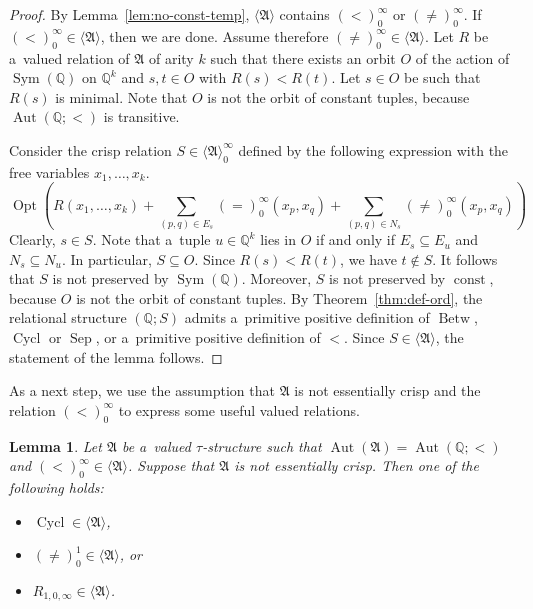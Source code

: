 \documentclass[preprint,12pt]{elsarticle}
\newcommand{\Q}{\mathbb Q}
\newcommand{\bA}{{\mathfrak A}}
\newcommand{\checked}[1]{#1}
\DeclareMathOperator{\Cyc}{Cycl}
\DeclareMathOperator{\Aut}{Aut}
\DeclareMathOperator{\Opt}{Opt}
\DeclareMathOperator{\Sym}{Sym}
\DeclareMathOperator{\const}{const}
\DeclareMathOperator{\Betw}{Betw}
\DeclareMathOperator{\Sep}{Sep}
\newtheorem{lemma}[theorem]{Lemma}
\begin{document}
\begin{proof}
By Lemma~\ref{lem:no-const-temp}, $\langle \bA \rangle$ contains $(<)_0^\infty$ or $(\neq)_0^\infty$. If $(<)_0^\infty \in \langle \bA \rangle$, then we are done. Assume therefore $(\neq)_0^\infty \in \langle \bA \rangle$. Let $R$ be a~valued relation of $\bA$ of arity $k$ such that there exists an orbit $O$ of the action of $\Sym(\Q)$ on $\Q^k$ and $s,t \in O$ with $R(s)<R(t)$. Let $s \in O$ be such that $R(s)$ is minimal. Note that $O$ is not the orbit of constant tuples, because $\Aut(\Q;<)$ is transitive.

Consider the crisp relation $S \in \langle \bA \rangle_0^\infty$ defined by the following expression with the free variables $x_1,\dots,x_k$. 
\[
\Opt \left( R(x_1, \dots, x_k) + \sum_{(p,q) \in E_s} (=)_0^\infty(x_p,x_q) + \sum_{(p,q) \in N_s} (\neq)_0^\infty(x_p,x_q) \right)\]
Clearly, $s \in S$.
Note that a~tuple $u \in \Q^k$ lies in $O$ if and only if
$E_s \subseteq E_u$ and $N_s \subseteq N_u$.
In particular, $S \subseteq O$.  Since $R(s) < R(t)$, we have $t \notin S$. It follows that $S$ is not preserved by $\Sym(\Q)$. Moreover, $S$ is not preserved by $\const$,  because $O$ is not the orbit of constant tuples. By Theorem~\ref{thm:def-ord}, the relational structure $(\Q; S)$
admits a~primitive positive definition of $\Betw$, $\Cyc$ or $\Sep$, 
or a~primitive positive  definition of $<$. Since $S \in \langle \bA \rangle$, the statement of the lemma follows.
\end{proof}


\checked{As a next step, we use the assumption that $\bA$ is not essentially crisp and the relation $(<)_0^\infty$ to express some useful valued relations.}

\begin{lemma}\label{lem:soft-neq}
Let $\bA$ be a~valued $\tau$-structure such that $\Aut(\bA) = \Aut(\Q; <)$ and $(<)_0^\infty \in \langle\bA\rangle$. Suppose that $\bA$ is not essentially crisp. Then one of the following holds:
\begin{itemize}
    \item $\Cyc \in \langle \bA \rangle$,
    \item $(\neq)_0^1 \in \langle \bA \rangle$, or
    \item $R_{1,0,\infty} \in \langle \bA \rangle$.
\end{itemize}
\end{lemma}
\end{document}
